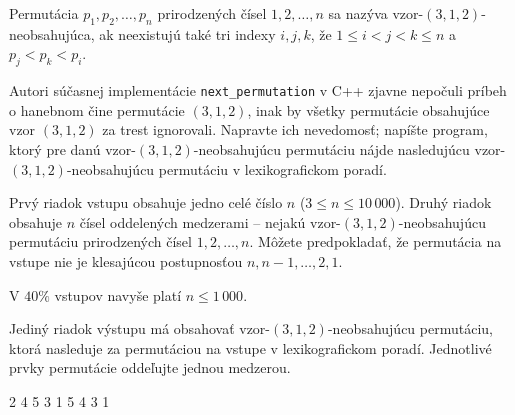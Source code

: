 
Permutácia $p_1, p_2, \dots, p_n$ prirodzených čísel $1, 2, \dots, n$ sa nazýva
vzor-$(3,1,2)$-neobsahujúca, ak neexistujú také tri indexy $i,j,k$, že $1 \leq i
< j < k \leq n$ a $p_j < p_k < p_i$.

Autori súčasnej implementácie \texttt{next\_permutation} v C++ zjavne nepočuli
príbeh o hanebnom čine permutácie $(3,1,2)$, inak by všetky permutácie
obsahujúce vzor $(3,1,2)$ za trest ignorovali. Napravte ich nevedomosť; napíšte
program, ktorý pre danú vzor-$(3,1,2)$-neobsahujúcu permutáciu nájde nasledujúcu
vzor-$(3,1,2)$-neobsahujúcu permutáciu v lexikografickom poradí.



Prvý riadok vstupu obsahuje jedno celé číslo $n$ ($3 \leq n \leq 10\,000$).
Druhý riadok obsahuje $n$ čísel oddelených medzerami -- nejakú
vzor-$(3,1,2)$-neobsahujúcu permutáciu prirodzených čísel $1, 2, \dots, n$.
Môžete predpokladať, že permutácia na vstupe nie je klesajúcou postupnosťou $n,
n-1, \dots, 2, 1$.

V $40\%$ vstupov navyše platí $n \leq 1\,000$.



Jediný riadok výstupu má obsahovať vzor-$(3,1,2)$-neobsahujúcu permutáciu,
ktorá nasleduje za permutáciou na vstupe v lexikografickom poradí. Jednotlivé
prvky permutácie oddeľujte jednou medzerou.



2 4 5 3 1
 5 4 3 1
\sampleCOMMENT

\sampleEND
\bigskip


